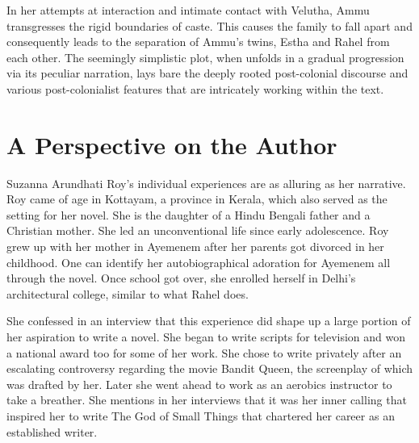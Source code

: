 In  her  attempts  at  interaction  and  intimate  contact  with  Velutha,  Ammu  transgresses  the  rigid  boundaries  of  caste.  This  causes  the  family  to  fall  apart  and  consequently  leads  to  the  separation  of  Ammu’s  twins,  Estha  and  Rahel  from  each  other.  The  seemingly  simplistic  plot,  when  unfolds  in  a  gradual  progression  via  its  peculiar  narration,  lays  bare  the  deeply  rooted  post-colonial  discourse  and  various  post-colonialist  features  that  are  intricately  working  within  the  text. \parencite{Nayar}

\section{A Perspective on the Author}

Suzanna  Arundhati  Roy’s  individual  experiences  are  as  alluring  as  her  narrative.  Roy  came  of  age  in  Kottayam,  a  province  in  Kerala,  which  also  served  as  the  setting  for  her  novel.  She  is  the  daughter  of  a  Hindu  Bengali  father  and  a  Christian  mother.  She  led  an  unconventional  life  since  early  adolescence.  Roy  grew  up  with  her  mother  in  Ayemenem  after  her  parents  got  divorced  in  her  childhood.  One  can  identify  her  autobiographical  adoration  for  Ayemenem  all  through  the  novel.  Once  school  got  over,  she  enrolled  herself  in  Delhi’s  architectural  college,  similar  to  what  Rahel  does.

She  confessed  in  an  interview  that  this  experience  did  shape  up  a  large  portion  of  her  aspiration  to  write  a  novel.  She  began  to  write  scripts  for  television  and  won  a  national  award  too  for  some  of  her  work.  She  chose  to  write  privately  after  an  escalating  controversy  regarding  the  movie  Bandit  Queen,  the  screenplay  of  which  was  drafted  by  her.  Later  she  went  ahead  to  work  as  an  aerobics  instructor  to  take  a  breather.  She  mentions  in  her  interviews  that  it  was  her  inner  calling  that  inspired  her  to  write  The  God  of  Small  Things  that  chartered  her  career  as  an  established  writer.

